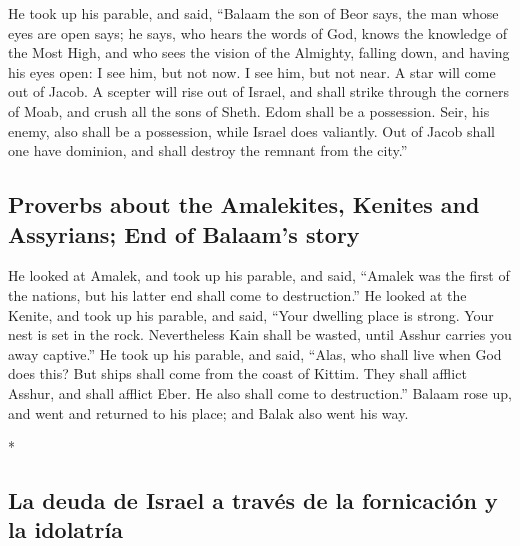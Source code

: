 \begin{paracol}{2}
\begin{otherlanguage}{english}
 He took up his parable, and said, ``Balaam the son of
Beor says, the man whose eyes are open says;  he says,
who hears the words of God, knows the knowledge of the Most High, and
who sees the vision of the Almighty, falling down, and having his eyes
open:  I see him, but not now. I see him, but not near. A
star will come out of Jacob. A scepter will rise out of Israel, and
shall strike through the corners of Moab, and crush all the sons of
Sheth.  Edom shall be a possession. Seir, his enemy, also
shall be a possession, while Israel does valiantly.  Out
of Jacob shall one have dominion, and shall destroy the remnant from the
city.''

\hypertarget{proverbs-about-the-amalekites-kenites-and-assyrians-end-of-balaams-story}{%
\subsection{Proverbs about the Amalekites, Kenites and Assyrians; End of
Balaam's
story}\label{proverbs-about-the-amalekites-kenites-and-assyrians-end-of-balaams-story}}

 He looked at Amalek, and took up his parable, and said,
``Amalek was the first of the nations, but his latter end shall come to
destruction.''  He looked at the Kenite, and took up his
parable, and said, ``Your dwelling place is strong. Your nest is set in
the rock.  Nevertheless Kain shall be wasted, until
Asshur carries you away captive.''  He took up his
parable, and said, ``Alas, who shall live when God does this?
 But ships shall come from the coast of Kittim. They
shall afflict Asshur, and shall afflict Eber. He also shall come to
destruction.''  Balaam rose up, and went and returned to
his place; and Balak also went his way.

\end{otherlanguage}

\switchcolumn[0]*

\hypertarget{la-deuda-de-israel-a-travuxe9s-de-la-fornicaciuxf3n-y-la-idolatruxeda}{%
\subsection{La deuda de Israel a través de la fornicación y la
idolatría}\label{la-deuda-de-israel-a-travuxe9s-de-la-fornicaciuxf3n-y-la-idolatruxeda}}

\hypertarget{section-48}{%
}
\end{paracol}
